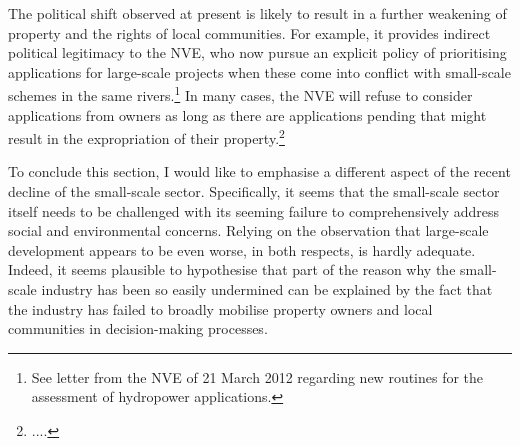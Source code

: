 The political shift observed at present is likely to result in a further weakening of property and the rights of local communities. For example, it provides indirect political legitimacy to the NVE, who now pursue an explicit policy of prioritising applications for large-scale projects when these come into conflict with small-scale schemes in the same rivers.\footnote{See letter from the NVE of 21 March 2012 regarding new routines for the assessment of hydropower applications.} In many cases, the NVE will refuse to consider applications from owners as long as there are applications pending that might result in the expropriation of their property.\footnote{....}


To conclude this section, I would like to emphasise a different aspect of the recent decline of the small-scale sector. Specifically, it seems that the small-scale sector itself needs to be challenged with its seeming failure to comprehensively address social and environmental concerns. Relying on the observation that large-scale development appears to be even worse, in both respects, is hardly adequate. Indeed, it seems plausible to hypothesise that part of the reason why the small-scale industry has been so easily undermined can be explained by the fact that the industry has failed to broadly mobilise property owners and local communities in decision-making processes.

